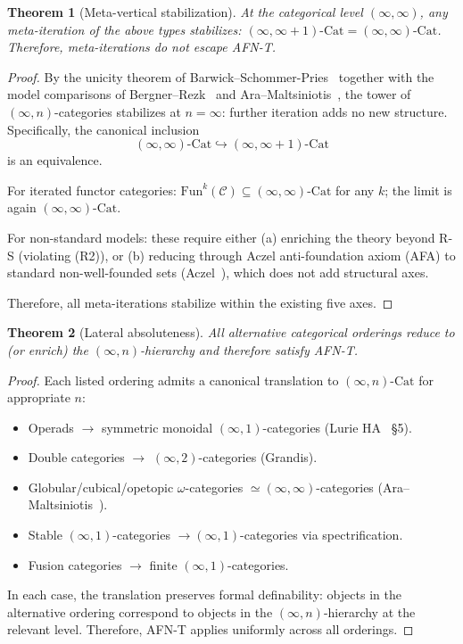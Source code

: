 \documentclass[11pt]{article}
\theoremstyle{plain}
\newtheorem{theorem}{Theorem}[section]
\theoremstyle{definition}
\newcommand{\cC}{\mathcal{C}}
\newcommand{\Fun}{\mathrm{Fun}}
\newcommand{\Cat}{\mathrm{Cat}}
\begin{document}
\begin{theorem}[Meta-vertical stabilization]\label{thm:meta-vertical}
At the categorical level $(\infty, \infty)$, any meta-iteration of the above types stabilizes: $(\infty, \infty + 1)\text{-}\Cat = (\infty, \infty)\text{-}\Cat$. Therefore, meta-iterations do not escape AFN-T.
\end{theorem}

\begin{proof}
By the unicity theorem of Barwick--Schommer-Pries~\cite{BarwickSchommerPries2021} together with the model comparisons of Bergner--Rezk~\cite{BergnerRezk2013} and Ara--Maltsiniotis~\cite{AraMaltsiniotis2017}, the tower of $(\infty, n)$-categories stabilizes at $n = \infty$: further iteration adds no new structure. Specifically, the canonical inclusion
\[ (\infty, \infty)\text{-}\Cat \hookrightarrow (\infty, \infty + 1)\text{-}\Cat \]
is an equivalence.

For iterated functor categories: $\Fun^k(\cC) \subseteq (\infty, \infty)\text{-}\Cat$ for any $k$; the limit is again $(\infty, \infty)$-$\Cat$.

For non-standard models: these require either (a) enriching the theory beyond R-S (violating (R2)), or (b) reducing through Aczel anti-foundation axiom (AFA) to standard non-well-founded sets (Aczel~\cite{Aczel1988}), which does not add structural axes.

Therefore, all meta-iterations stabilize within the existing five axes.
\end{proof}

\begin{theorem}[Lateral absoluteness]\label{thm:lateral}
All alternative categorical orderings reduce to (or enrich) the $(\infty, n)$-hierarchy and therefore satisfy AFN-T.
\end{theorem}

\begin{proof}
Each listed ordering admits a canonical translation to $(\infty, n)$-$\Cat$ for appropriate $n$:
\begin{itemize}
\item Operads $\to$ symmetric monoidal $(\infty, 1)$-categories (Lurie HA~\cite{LurieHA} \S 5).
\item Double categories $\to$ $(\infty, 2)$-categories (Grandis).
\item Globular/cubical/opetopic $\omega$-categories $\simeq (\infty, \infty)$-categories (Ara--Maltsiniotis~\cite{AraMaltsiniotis2017}).
\item Stable $(\infty, 1)$-categories $\to (\infty, 1)$-categories via spectrification.
\item Fusion categories $\to$ finite $(\infty, 1)$-categories.
\end{itemize}
In each case, the translation preserves formal definability: objects in the alternative ordering correspond to objects in the $(\infty, n)$-hierarchy at the relevant level. Therefore, AFN-T applies uniformly across all orderings.
\end{proof}
\end{document}
